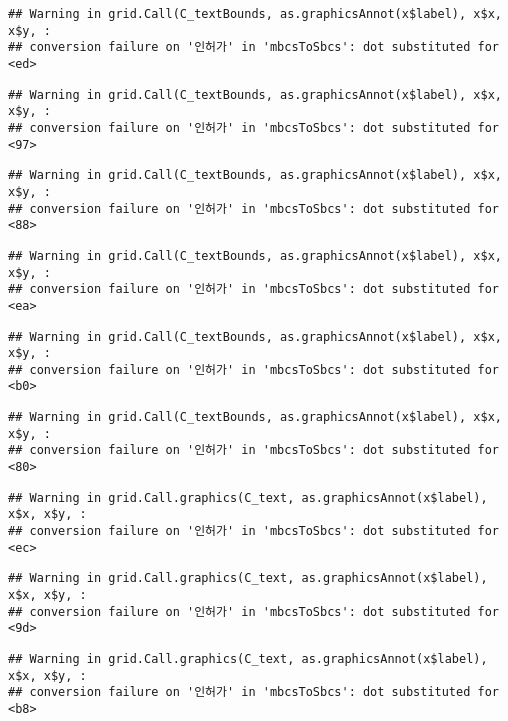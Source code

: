 \documentclass[
]{book}
\begin{document}
\begin{verbatim}
## Warning in grid.Call(C_textBounds, as.graphicsAnnot(x$label), x$x, x$y, :
## conversion failure on '인허가' in 'mbcsToSbcs': dot substituted for <ed>
\end{verbatim}

\begin{verbatim}
## Warning in grid.Call(C_textBounds, as.graphicsAnnot(x$label), x$x, x$y, :
## conversion failure on '인허가' in 'mbcsToSbcs': dot substituted for <97>
\end{verbatim}

\begin{verbatim}
## Warning in grid.Call(C_textBounds, as.graphicsAnnot(x$label), x$x, x$y, :
## conversion failure on '인허가' in 'mbcsToSbcs': dot substituted for <88>
\end{verbatim}

\begin{verbatim}
## Warning in grid.Call(C_textBounds, as.graphicsAnnot(x$label), x$x, x$y, :
## conversion failure on '인허가' in 'mbcsToSbcs': dot substituted for <ea>
\end{verbatim}

\begin{verbatim}
## Warning in grid.Call(C_textBounds, as.graphicsAnnot(x$label), x$x, x$y, :
## conversion failure on '인허가' in 'mbcsToSbcs': dot substituted for <b0>
\end{verbatim}

\begin{verbatim}
## Warning in grid.Call(C_textBounds, as.graphicsAnnot(x$label), x$x, x$y, :
## conversion failure on '인허가' in 'mbcsToSbcs': dot substituted for <80>
\end{verbatim}

\begin{verbatim}
## Warning in grid.Call.graphics(C_text, as.graphicsAnnot(x$label), x$x, x$y, :
## conversion failure on '인허가' in 'mbcsToSbcs': dot substituted for <ec>
\end{verbatim}

\begin{verbatim}
## Warning in grid.Call.graphics(C_text, as.graphicsAnnot(x$label), x$x, x$y, :
## conversion failure on '인허가' in 'mbcsToSbcs': dot substituted for <9d>
\end{verbatim}

\begin{verbatim}
## Warning in grid.Call.graphics(C_text, as.graphicsAnnot(x$label), x$x, x$y, :
## conversion failure on '인허가' in 'mbcsToSbcs': dot substituted for <b8>
\end{verbatim}
\end{document}
